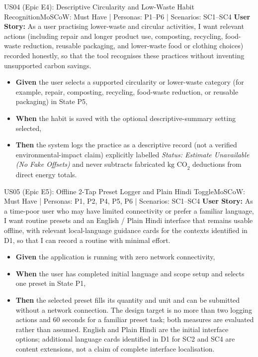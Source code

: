 \documentclass[12pt,a4paper]{article}
\begin{document}
\begin{storybox}{US04 (Epic E4): Descriptive Circularity and Low-Waste Habit Recognition}{MoSCoW: Must Have | Personas: P1--P6 | Scenarios: SC1--SC4}
\textbf{User Story:} As a user practising lower-waste and circular activities, I want relevant actions (including repair and longer product use, composting, recycling, food-waste reduction, reusable packaging, and lower-waste food or clothing choices) recorded honestly, so that the tool recognises these practices without inventing unsupported carbon savings.
\begin{itemize}
    \item \textbf{Given} the user selects a supported circularity or lower-waste category (for example, repair, composting, recycling, food-waste reduction, or reusable packaging) in State P5,
    \item \textbf{When} the habit is saved with the optional descriptive-summary setting selected,
    \item \textbf{Then} the system logs the practice as a descriptive record (not a verified environmental-impact claim) explicitly labelled \textit{Status: Estimate Unavailable (No Fake Offsets)} and never subtracts fabricated $\text{kg CO}_2$ deductions from direct energy totals.
\end{itemize}
\end{storybox}

\begin{storybox}{US05 (Epic E5): Offline 2-Tap Preset Logger and Plain Hindi Toggle}{MoSCoW: Must Have | Personas: P1, P2, P4, P5, P6 | Scenarios: SC1--SC4}
\textbf{User Story:} As a time-poor user who may have limited connectivity or prefer a familiar language, I want routine presets and an English / Plain Hindi interface that remains usable offline, with relevant local-language guidance cards for the contexts identified in D1, so that I can record a routine with minimal effort.
\begin{itemize}
    \item \textbf{Given} the application is running with zero network connectivity,
    \item \textbf{When} the user has completed initial language and scope setup and selects one preset in State P1,
    \item \textbf{Then} the selected preset fills its quantity and unit and can be submitted without a network connection. The design target is no more than two logging actions and 60 seconds for a familiar preset task; both measures are evaluated rather than assumed. English and Plain Hindi are the initial interface options; additional language cards identified in D1 for SC2 and SC4 are content extensions, not a claim of complete interface localisation.
\end{itemize}
\end{storybox}
\end{document}
